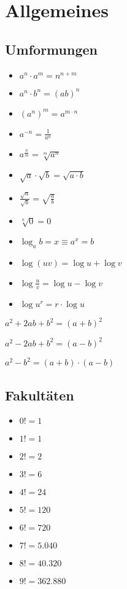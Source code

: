 \documentclass[10pt,a4paper,twoside,twocolumn]{article}
\begin{document}
	\section{Allgemeines}
	
	\subsection{Umformungen}
	
	\begin{itemize}
		\setlength\itemsep{0em}
		\item $ a^n \cdot a^m = n^{n+m} $
		\item $ a^n \cdot b^n = (ab)^n $
		\item $ {(a^n)}^m = a^{m \cdot n} $
		\item $ a^{-n} = \frac{1}{a^n} $
		\item $ a^{\frac{n}{m}} = \sqrt[m]{a^n} $
		\item $ \sqrt{a} \cdot \sqrt{b} = \sqrt{a \cdot b} $
		\item $ \frac{\sqrt{a}}{\sqrt{b}} = \sqrt{\frac{a}{b}} $
		\item $ \sqrt[n]{0} = 0 $
		\item $ \log_ab = x \equiv a^x = b $
		\item $ \log(uv) = \log u + \log v $
		\item $ \log\frac{u}{v} = \log u - \log v $
		\item $ \log u^r = r \cdot \log u $
	\end{itemize}

	$ a^2 + 2ab + b^2 = (a + b)^2 $
	
	$ a^2 - 2ab + b^2  = (a - b)^2 $
	
	$ a^2 - b^2 = (a + b) \cdot (a - b) $

	\subsection{Fakultäten}
	
	\begin{itemize}
		\setlength\itemsep{0em}
		\item $ 0! = 1 $
		\item $ 1! = 1 $
		\item $ 2! = 2 $
		\item $ 3! = 6 $
		\item $ 4! = 24 $
		\item $ 5! = 120 $
		\item $ 6! = 720 $
		\item $ 7! = 5.040 $
		\item $ 8! = 40.320 $
		\item $ 9! = 362.880 $
	\end{itemize}	
\end{document}
